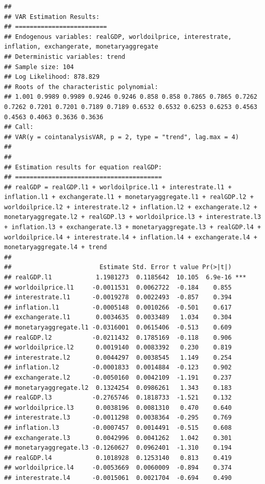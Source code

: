 \documentclass[11pt,preprint, authoryear]{elsarticle}
\numberwithin{equation}{section}
\numberwithin{figure}{section}
\numberwithin{table}{section}
\begin{document}
\begin{verbatim}
## 
## VAR Estimation Results:
## ========================= 
## Endogenous variables: realGDP, worldoilprice, interestrate, inflation, exchangerate, monetaryaggregate 
## Deterministic variables: trend 
## Sample size: 104 
## Log Likelihood: 878.829 
## Roots of the characteristic polynomial:
## 1.001 0.9989 0.9989 0.9246 0.9246 0.858 0.858 0.7865 0.7865 0.7262 0.7262 0.7201 0.7201 0.7189 0.7189 0.6532 0.6532 0.6253 0.6253 0.4563 0.4563 0.4063 0.3636 0.3636
## Call:
## VAR(y = cointanalysisVAR, p = 2, type = "trend", lag.max = 4)
## 
## 
## Estimation results for equation realGDP: 
## ======================================== 
## realGDP = realGDP.l1 + worldoilprice.l1 + interestrate.l1 + inflation.l1 + exchangerate.l1 + monetaryaggregate.l1 + realGDP.l2 + worldoilprice.l2 + interestrate.l2 + inflation.l2 + exchangerate.l2 + monetaryaggregate.l2 + realGDP.l3 + worldoilprice.l3 + interestrate.l3 + inflation.l3 + exchangerate.l3 + monetaryaggregate.l3 + realGDP.l4 + worldoilprice.l4 + interestrate.l4 + inflation.l4 + exchangerate.l4 + monetaryaggregate.l4 + trend 
## 
##                        Estimate Std. Error t value Pr(>|t|)    
## realGDP.l1            1.1981273  0.1185642  10.105  6.9e-16 ***
## worldoilprice.l1     -0.0011531  0.0062722  -0.184    0.855    
## interestrate.l1      -0.0019278  0.0022493  -0.857    0.394    
## inflation.l1         -0.0005148  0.0010266  -0.501    0.617    
## exchangerate.l1       0.0034635  0.0033489   1.034    0.304    
## monetaryaggregate.l1 -0.0316001  0.0615406  -0.513    0.609    
## realGDP.l2           -0.0211432  0.1785169  -0.118    0.906    
## worldoilprice.l2      0.0019140  0.0083392   0.230    0.819    
## interestrate.l2       0.0044297  0.0038545   1.149    0.254    
## inflation.l2         -0.0001833  0.0014884  -0.123    0.902    
## exchangerate.l2      -0.0050160  0.0042109  -1.191    0.237    
## monetaryaggregate.l2  0.1324254  0.0986261   1.343    0.183    
## realGDP.l3           -0.2765746  0.1818733  -1.521    0.132    
## worldoilprice.l3      0.0038196  0.0081310   0.470    0.640    
## interestrate.l3      -0.0011298  0.0038364  -0.295    0.769    
## inflation.l3         -0.0007457  0.0014491  -0.515    0.608    
## exchangerate.l3       0.0042996  0.0041262   1.042    0.301    
## monetaryaggregate.l3 -0.1260627  0.0962401  -1.310    0.194    
## realGDP.l4            0.1018928  0.1253140   0.813    0.419    
## worldoilprice.l4     -0.0053669  0.0060009  -0.894    0.374    
## interestrate.l4      -0.0015061  0.0021704  -0.694    0.490    

\end{verbatim}
\end{document}
